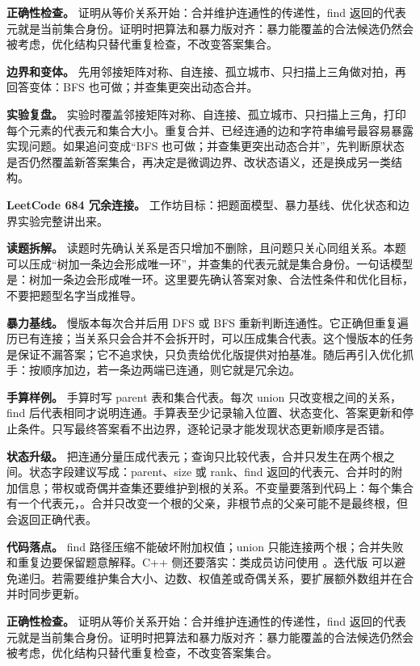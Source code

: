 \textbf{正确性检查。} 证明从等价关系开始：合并维护连通性的传递性，find 返回的代表元就是当前集合身份。证明时把算法和暴力版对齐：暴力能覆盖的合法候选仍然会被考虑，优化结构只替代重复检查，不改变答案集合。

\textbf{边界和变体。} 先用邻接矩阵对称、自连接、孤立城市、只扫描上三角做对拍，再回答变体：BFS 也可做；并查集更突出动态合并。

\textbf{实验复盘。} 实验时覆盖邻接矩阵对称、自连接、孤立城市、只扫描上三角，打印每个元素的代表元和集合大小。重复合并、已经连通的边和字符串编号最容易暴露实现问题。如果追问变成“BFS 也可做；并查集更突出动态合并”，先判断原状态是否仍然覆盖新答案集合，再决定是微调边界、改状态语义，还是换成另一类结构。

\noindent\textbf{LeetCode 684 冗余连接。} 工作坊目标：把题面模型、暴力基线、优化状态和边界实验完整讲出来。

\textbf{读题拆解。} 读题时先确认关系是否只增加不删除，且问题只关心同组关系。本题可以压成“树加一条边会形成唯一环”，并查集的代表元就是集合身份。一句话模型是：树加一条边会形成唯一环。这里要先确认答案对象、合法性条件和优化目标，不要把题型名字当成推导。

\textbf{暴力基线。} 慢版本每次合并后用 DFS 或 BFS 重新判断连通性。它正确但重复遍历已有连接；当关系只会合并不会拆开时，可以压成集合代表。这个慢版本的任务是保证不漏答案；它不追求快，只负责给优化版提供对拍基准。随后再引入优化抓手：按顺序加边，若一条边两端已连通，则它就是冗余边。

\textbf{手算样例。} 手算时写 parent 表和集合代表。每次 union 只改变根之间的关系，find 后代表相同才说明连通。手算表至少记录输入位置、状态变化、答案更新和停止条件。只写最终答案看不出边界，逐轮记录才能发现状态更新顺序是否错。

\textbf{状态升级。} 把连通分量压成代表元；查询只比较代表，合并只发生在两个根之间。状态字段建议写成：parent、size 或 rank、find 返回的代表元、合并时的附加信息；带权或奇偶并查集还要维护到根的关系。不变量要落到代码上：每个集合有一个代表元，。合并只改变一个根的父亲，非根节点的父亲可能不是最终根，但  会返回正确代表。

\textbf{代码落点。} find 路径压缩不能破坏附加权值；union 只能连接两个根；合并失败和重复边要保留题意解释。C++ 侧还要落实：类成员访问使用 。迭代版  可以避免递归。若需要维护集合大小、边数、权值差或奇偶关系，要扩展额外数组并在合并时同步更新。

\textbf{正确性检查。} 证明从等价关系开始：合并维护连通性的传递性，find 返回的代表元就是当前集合身份。证明时把算法和暴力版对齐：暴力能覆盖的合法候选仍然会被考虑，优化结构只替代重复检查，不改变答案集合。

